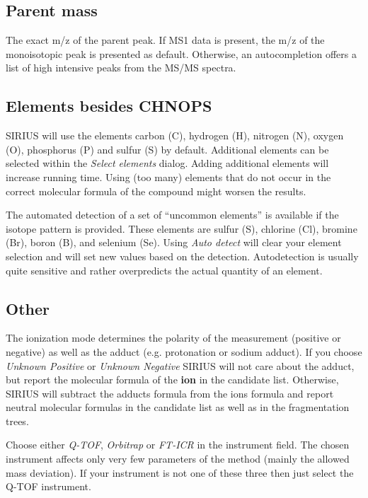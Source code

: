\documentclass[letterpaper,10pt,openany,oneside]{sphinxmanual}
\newcommand\gui[1]{\textsl{\guilsinglleft#1\guilsinglright\xspace}}
\begin{document}
\subsection{Parent mass}
\label{gui:parent-mass}

The exact m/z of the parent peak. If MS1 data is present, the m/z of the monoisotopic peak is presented as default. Otherwise, an autocompletion offers a list of high intensive peaks from the MS/MS spectra.


\subsection{Elements besides CHNOPS}
\label{gui:elements-besides-chnops}
SIRIUS will use the elements carbon (C), hydrogen (H), nitrogen (N), oxygen (O), phosphorus (P) and sulfur (S) by default. Additional elements can be selected within the \gui{Select elements} dialog. 
Adding additional elements will increase running time. Using (too many) elements that do not occur in the correct molecular formula of the compound might worsen the results.

The automated detection of a set of ``uncommon elements'' is available if the 
isotope pattern is provided. These elements are sulfur (S), chlorine (Cl), 
bromine (Br), boron (B), and selenium (Se). 
Using \gui{Auto detect} will clear your element selection and will set new values based on the detection. Autodetection is usually quite sensitive and rather overpredicts the actual quantity of an element.

\subsection{Other}
\label{gui:other}

The ionization mode determines the polarity of the measurement (positive or negative) as well as the adduct (e.g. protonation or sodium adduct). If you choose \gui{Unknown Positive} or \gui{Unknown Negative} SIRIUS will not care about the adduct, but report the molecular formula of the \textbf{ion} in the candidate list. Otherwise, SIRIUS will subtract the adducts formula from the ions formula and report neutral molecular formulas in the candidate list as well as in the fragmentation trees.

Choose either \gui{Q-TOF}, \gui{Orbitrap} or \gui{FT-ICR} in the instrument field. The chosen instrument affects only very few parameters of the method (mainly the allowed mass deviation). If your instrument is not one of these three then just select the Q-TOF instrument.
\end{document}

